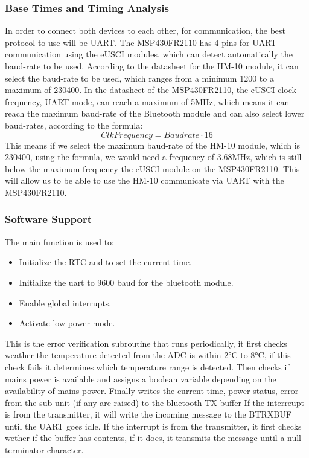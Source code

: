 \subsubsection{Base Times and Timing Analysis}
In order to connect both devices to each other, for communication, the best protocol to use will be UART. The MSP430FR2110 has 4 pins for UART communication using the eUSCI modules, which can detect automatically the baud-rate to be used. According to the datasheet for the HM-10 module\cite{AmazonComHiLetgo}, it can select the baud-rate to be used, which ranges from a minimum 1200 to a maximum of 230400. In the datasheet of the MSP430FR2110, the eUSCI clock frequency, UART mode, can reach a maximum of 5MHz, which means it can reach the maximum baud-rate of the Bluetooth module and can also select lower baud-rates, according to the formula:
\begin{equation}
	Clk Frequency = Baudrate \cdot 16
	\label{eq:UART Frequency}
\end{equation}
This means if we select the maximum baud-rate of the HM-10 module, which is 230400, using the formula, we would need a frequency of 3.68MHz, which is still below the maximum frequency the eUSCI module on the MSP430FR2110. This will allow us to be able to use the HM-10 communicate via UART with the MSP430FR2110.\\
\subsubsection{Software Support}
The main function is used to:
  \begin{itemize}
    \item Initialize the RTC and to set the current time.
    \item Initialize the uart to 9600 baud for the bluetooth module.
    \item Enable global interrupts.
    \item Activate low power mode.
  \end{itemize}
This is the error verification subroutine that runs periodically, it first checks weather the temperature detected from the ADC is within 2\si{\celsius} to 8\si{\celsius}, if this check fails it determines which temperature range is detected. Then checks if mains power is available and assigns a boolean variable depending on the availability of mains power. Finally writes the current time, power status, error from the sub unit (if any are raised) to the bluetooth TX buffer
If the interreupt is from the transmitter, it will write the incoming message to the BTRXBUF until the UART goes idle. If the interrupt is from the transmitter, it first checks wether if the buffer has contents, if it does, it transmits the message until a null terminator character.
